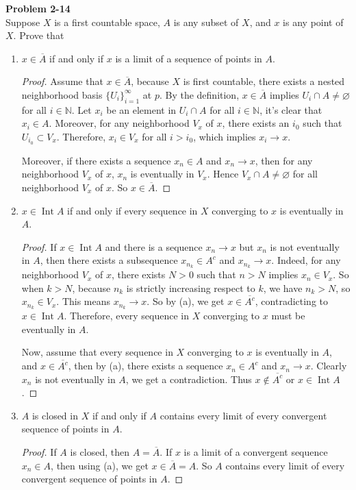 \documentclass[12pt, a4paper]{article}
\theoremstyle{plain}
\newcommand{\N}{\mathbb{N}}
\DeclareMathOperator{\inter}{Int}
\newenvironment{problem}[2][Problem]
    { \begin{mdframed}[backgroundcolor=gray!20] \textbf{#1 #2} \\}
    {  \end{mdframed}}
\begin{document}
\begin{problem}{2-14}
Suppose $X$ is a first countable space, $A$ is any subset of $X$, and $x$ is any point of $X$. Prove that
\begin{enumerate}[label=(\alph*)]
\item $x\in \overline{A}$ if and only if $x$ is a limit of a sequence of points in $A$.
	\begin{proof}
	Assume that $x\in\overline{A}$, because $X$ is first countable, there exists a nested neighborhood basis $\{U_i\}_{i=1}^{\infty}$ at $p$. By the definition, $x\in\overline{A}$ implies $U_i\cap A\neq\varnothing$ for all $i\in \N$. Let $x_i$ be an element in $U_i\cap A$ for all $i\in \N$, it's clear that $x_i\in A$. Moreover, for any neighborhood $V_x$ of $x$, there exists an $i_0$ such that $U_{i_0}\subset V_x$. Therefore, $x_i\in V_x$ for all $i>i_0$, which implies $x_i\rightarrow x$.
	
	Moreover, if there exists a sequence $x_n\in A$ and $x_n\rightarrow x$, then for any neighborhood $V_x$ of $x$, $x_n$ is eventually in $V_x$. Hence $V_x\cap A\neq\varnothing$ for all neighborhood $V_x$ of $x$. So $x\in\overline{A}$.
	\end{proof}

\item $x\in\inter{A}$ if and only if every sequence in $X$ converging to $x$ is eventually in $A$.
	\begin{proof}
	If $x\in \inter{A}$ and there is a sequence $x_n\rightarrow x$ but $x_n$ is not eventually in $A$, then there exists a subsequence $x_{n_k}\in A^c$ and $x_{n_k}\rightarrow x$. Indeed, for any neighborhood $V_x$ of $x$, there exists $N>0$ such that $n>N$ implies $x_n\in V_x$. So when $k>N$, because $n_k$ is strictly increasing respect to $k$, we have $n_k>N$, so $x_{n_k}\in V_x$. This means $x_{n_k}\rightarrow x$. So by (a), we get $x\in\overline{A^c}$, contradicting to $x\in\inter{A}$. Therefore, every sequence in $X$ converging to $x$ must be eventually in $A$.
	
	Now, assume that every sequence in $X$ converging to $x$ is eventually in $A$, and $x\in \overline{A^c}$, then by (a), there exists a sequence $x_n\in A^c$ and $x_n\rightarrow x$. Clearly $x_n$ is not eventually in $A$, we get a contradiction. Thus $x\notin \overline{A^c}$ or $x\in\inter{A}$.
	\end{proof}

\item $A$ is closed in $X$ if and only if $A$ contains every limit of every convergent sequence of points in $A$.
	\begin{proof}
	If $A$ is closed, then $A=\overline{A}$. If $x$ is a limit of a convergent sequence $x_n\in A$, then using (a), we get $x\in \overline{A}=A$. So $A$ contains every limit of every convergent sequence of points in $A$.
	

\end{proof}
\end{enumerate}
\end{problem}
\end{document}
